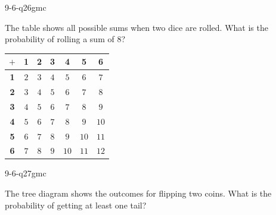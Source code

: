 \begin{practiceQuestion}{9-6-q26}{gmc}
\begin{questionText}
The table shows all possible sums when two dice are rolled. What is the probability of rolling a sum of $8$?

\begin{center}
\begin{tabular}{|c|c|c|c|c|c|c|}
\hline
$+$ & \textbf{1} & \textbf{2} & \textbf{3} & \textbf{4} & \textbf{5} & \textbf{6} \\
\hline
\textbf{1} & $2$ & $3$ & $4$ & $5$ & $6$ & $7$ \\
\hline
\textbf{2} & $3$ & $4$ & $5$ & $6$ & $7$ & \cellcolor{funBlue!20}$8$ \\
\hline
\textbf{3} & $4$ & $5$ & $6$ & $7$ & \cellcolor{funBlue!20}$8$ & $9$ \\
\hline
\textbf{4} & $5$ & $6$ & $7$ & \cellcolor{funBlue!20}$8$ & $9$ & $10$ \\
\hline
\textbf{5} & $6$ & $7$ & \cellcolor{funBlue!20}$8$ & $9$ & $10$ & $11$ \\
\hline
\textbf{6} & $7$ & \cellcolor{funBlue!20}$8$ & $9$ & $10$ & $11$ & $12$ \\
\hline
\end{tabular}
\end{center}
\end{questionText}
\end{practiceQuestion}

\begin{practiceQuestion}{9-6-q27}{gmc}
\begin{questionText}
The tree diagram shows the outcomes for flipping two coins. What is the probability of getting at least one tail?

\begin{center}
\end{center}
\end{questionText}
\end{practiceQuestion}

